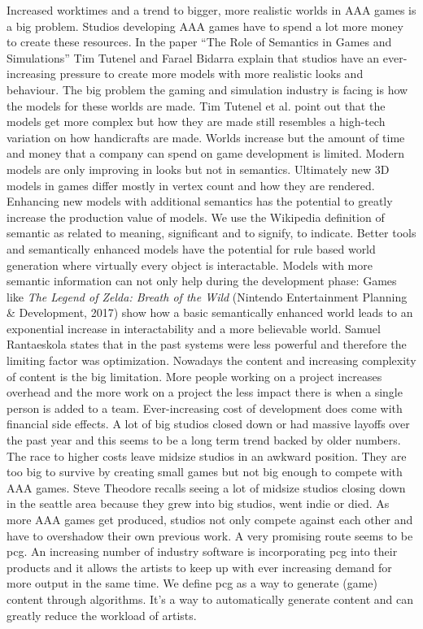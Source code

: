 \documentclass[10pt,a4paper]{article}
\begin{document}
\begin{multicols}{2}
Increased worktimes and a trend to bigger, more realistic worlds in AAA games is a big problem. Studios developing AAA games have to spend a lot more money to create these resources. In the paper “The Role of Semantics in Games and Simulations” Tim Tutenel and Farael Bidarra explain that studios have an ever-increasing pressure to create more models with more realistic looks and behaviour. The big problem the gaming and simulation industry is facing is how the models for these worlds are made. Tim Tutenel et al. point out that the models get more complex but how they are made still resembles a high-tech variation on how handicrafts are made\cite{Tutenel2008}. Worlds increase but the amount of time and money that a company can spend on game development is limited. Modern models are only improving in looks but not in semantics. Ultimately new 3D models in games differ mostly in vertex count and how they are rendered. Enhancing new models with additional semantics has the potential to greatly increase the production value of models. We use the Wikipedia definition of semantic as related to meaning, significant and to signify, to indicate\cite{Wikipediacontributors2019}. Better tools and semantically enhanced models have the potential for rule based world generation where virtually every object is interactable. Models with more semantic information can not only help during the development phase: Games like \textit{The Legend of Zelda: Breath of the Wild} (Nintendo Entertainment Planning \& Development, 2017) show how a basic semantically enhanced world leads to an exponential increase in interactability and a more believable world. Samuel Rantaeskola\cite{Prinke2017} states that in the past systems were less powerful and therefore the limiting factor was optimization. Nowadays the content and increasing complexity of content is the big limitation. More people working on a project increases overhead and the more work on a project the less impact there is when a single person is added to a team.
Ever-increasing cost of development does come with financial side effects. A lot of big studios closed down or had massive layoffs over the past year \cite{Lahti2018, Schreier2019, Walker2019, Schreier2019a} and this seems to be a long term trend backed by older numbers\cite{Plunkett2012}. The race to higher costs leave midsize studios in an awkward position. They are too big to survive by creating small games but not big enough to compete with AAA games. Steve Theodore recalls seeing a lot of midsize studios closing down in the seattle area because they grew into big studios, went indie or died\cite{Prinke2017}. As more AAA games get produced, studios not only compete against each other and have to overshadow their own previous work. A very promising route seems to be \gls{pcg}. An increasing number of industry software is incorporating \gls{pcg} into their products and it allows the artists to keep up with ever increasing demand for more output in the same time. We define \gls{pcg} as a way to generate (game) content through algorithms. It’s a way to automatically generate content and can greatly reduce the workload of artists.
\end{multicols}
\end{document}
